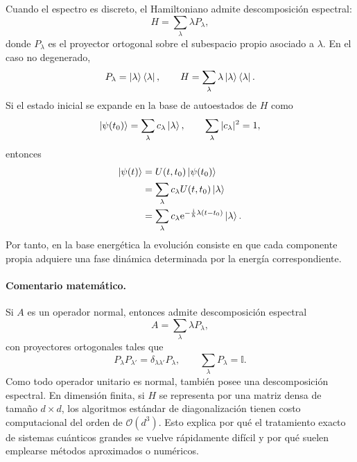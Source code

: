 \documentclass[12pt,a4paper]{article}
\theoremstyle{definition}
\theoremstyle{plain}
\theoremstyle{remark}
\newcommand{\I}{\mathbb{I}}
\newcommand{\ii}{\mathrm{i}}
\newcommand{\ee}{\mathrm{e}}
\begin{document}
Cuando el espectro es discreto, el Hamiltoniano admite descomposición espectral:
\begin{equation*}
    H=\sum_{\lambda}\lambda P_\lambda,
\end{equation*}
donde $P_\lambda$ es el proyector ortogonal sobre el subespacio propio asociado a $\lambda$. En el caso no degenerado,
\begin{equation*}
    P_\lambda=\ket{\lambda}\bra{\lambda},
    \qquad
    H=\sum_{\lambda}\lambda\ket{\lambda}\bra{\lambda}.
\end{equation*}
Si el estado inicial se expande en la base de autoestados de $H$ como
\begin{equation*}
    \ket{\psi(t_0)}=\sum_{\lambda}c_\lambda\ket{\lambda},
    \qquad
    \sum_{\lambda}|c_\lambda|^2=1,
\end{equation*}
entonces
\begin{align*}
    \ket{\psi(t)}
    &=
    U(t,t_0)\ket{\psi(t_0)}\\
    &=
    \sum_{\lambda}c_\lambda U(t,t_0)\ket{\lambda}\\
    &=
    \sum_{\lambda}c_\lambda \ee^{-\frac{\ii}{\hbar}\lambda(t-t_0)}\ket{\lambda}.
\end{align*}
Por tanto, en la base energética la evolución consiste en que cada componente propia adquiere una fase dinámica determinada por la energía correspondiente.

\paragraph{Comentario matemático.}
Si $A$ es un operador normal, entonces admite descomposición espectral
\begin{equation*}
    A=\sum_{\lambda}\lambda P_\lambda,
\end{equation*}
con proyectores ortogonales tales que
\begin{equation*}
    P_\lambda P_{\lambda'}=\delta_{\lambda\lambda'}P_\lambda,
    \qquad
    \sum_{\lambda}P_\lambda=\I.
\end{equation*}
Como todo operador unitario es normal, también posee una descomposición espectral. En dimensión finita, si $H$ se representa por una matriz densa de tamaño $d\times d$, los algoritmos estándar de diagonalización tienen costo computacional del orden de $\mathcal{O}(d^3)$. Esto explica por qué el tratamiento exacto de sistemas cuánticos grandes se vuelve rápidamente difícil y por qué suelen emplearse métodos aproximados o numéricos.
\end{document}
